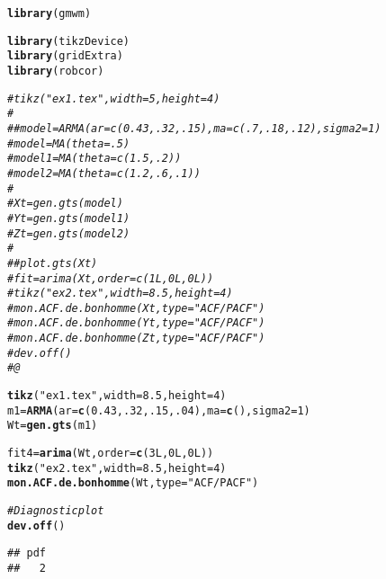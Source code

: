 \documentclass{article}\usepackage[]{graphicx}\usepackage[]{color}
\makeatletter
\newcommand{\hlnum}[1]{\textcolor[rgb]{0.686,0.059,0.569}{#1}}%
\newcommand{\hlstr}[1]{\textcolor[rgb]{0.192,0.494,0.8}{#1}}%
\newcommand{\hlcom}[1]{\textcolor[rgb]{0.678,0.584,0.686}{\textit{#1}}}%
\newcommand{\hlstd}[1]{\textcolor[rgb]{0.345,0.345,0.345}{#1}}%
\newcommand{\hlkwb}[1]{\textcolor[rgb]{0.69,0.353,0.396}{#1}}%
\newcommand{\hlkwc}[1]{\textcolor[rgb]{0.333,0.667,0.333}{#1}}%
\newcommand{\hlkwd}[1]{\textcolor[rgb]{0.737,0.353,0.396}{\textbf{#1}}}%
\newenvironment{kframe}{%
 \def\at@end@of@kframe{}%
 \ifinner\ifhmode%
  \def\at@end@of@kframe{\end{minipage}}%
  \begin{minipage}{\columnwidth}%
 \fi\fi%
 \def\FrameCommand##1{\hskip\@totalleftmargin \hskip-\fboxsep
 \colorbox{shadecolor}{##1}\hskip-\fboxsep
     \hskip-\linewidth \hskip-\@totalleftmargin \hskip\columnwidth}%
 \MakeFramed {\advance\hsize-\width
   \@totalleftmargin\z@ \linewidth\hsize
   \@setminipage}}%
 {\par\unskip\endMakeFramed%
 \at@end@of@kframe}
\newenvironment{knitrout}{}{} %
\makeatother
\begin{document}
\begin{knitrout}
\color{fgcolor}\begin{kframe}
\begin{alltt}
\hlkwd{library}\hlstd{(gmwm)}
\end{alltt}


{\ttfamily\noindent\itshape\color{messagecolor}{\#\# Loading required package: ggplot2}}\begin{alltt}
\hlkwd{library}\hlstd{(tikzDevice)}
\hlkwd{library}\hlstd{(gridExtra)}
\hlkwd{library}\hlstd{(robcor)}

\hlcom{# tikz("ex1.tex", width = 5, height = 4)}
\hlcom{# }
\hlcom{# #model = ARMA(ar = c(0.43,.32, .15), ma = c(.7, .18, .12),sigma2 = 1)}
\hlcom{# model = MA(theta = .5)}
\hlcom{# model1 = MA(theta = c(1.5,.2))}
\hlcom{# model2 = MA(theta = c(1.2,.6,.1))}
\hlcom{# }
\hlcom{# Xt = gen.gts(model)}
\hlcom{# Yt = gen.gts(model1)}
\hlcom{# Zt = gen.gts(model2)}
\hlcom{# }
\hlcom{# #plot.gts(Xt)}
\hlcom{# fit = arima(Xt,order = c(1L,0L,0L))}
\hlcom{# tikz("ex2.tex", width = 8.5, height = 4)}
\hlcom{# mon.ACF.de.bonhomme(Xt, type = "ACF/PACF")}
\hlcom{# mon.ACF.de.bonhomme(Yt, type = "ACF/PACF")}
\hlcom{# mon.ACF.de.bonhomme(Zt, type = "ACF/PACF")}
\hlcom{# dev.off()}
\hlcom{# @}

\hlkwd{tikz}\hlstd{(}\hlstr{"ex1.tex"}\hlstd{,} \hlkwc{width} \hlstd{=} \hlnum{8.5}\hlstd{,} \hlkwc{height} \hlstd{=} \hlnum{4}\hlstd{)}
\hlstd{m1} \hlkwb{=} \hlkwd{ARMA}\hlstd{(}\hlkwc{ar} \hlstd{=} \hlkwd{c}\hlstd{(}\hlnum{0.43}\hlstd{,}\hlnum{.32}\hlstd{,} \hlnum{.15}\hlstd{,} \hlnum{.04}\hlstd{),} \hlkwc{ma} \hlstd{=} \hlkwd{c}\hlstd{() ,}\hlkwc{sigma2} \hlstd{=} \hlnum{1}\hlstd{)}
\hlstd{Wt} \hlkwb{=} \hlkwd{gen.gts}\hlstd{(m1)}

\hlstd{fit4} \hlkwb{=} \hlkwd{arima}\hlstd{(Wt,}\hlkwc{order} \hlstd{=} \hlkwd{c}\hlstd{(}\hlnum{3L}\hlstd{,}\hlnum{0L}\hlstd{,}\hlnum{0L}\hlstd{))}
\hlkwd{tikz}\hlstd{(}\hlstr{"ex2.tex"}\hlstd{,} \hlkwc{width} \hlstd{=} \hlnum{8.5}\hlstd{,} \hlkwc{height} \hlstd{=} \hlnum{4}\hlstd{)}
\hlkwd{mon.ACF.de.bonhomme} \hlstd{(Wt,} \hlkwc{type} \hlstd{=} \hlstr{"ACF/PACF"}\hlstd{)}
\end{alltt}


{\ttfamily\noindent\color{warningcolor}{\#\# Warning: Removed 1 rows containing missing values (geom\_segment).}}\begin{alltt}
\hlcom{# Diagnostic plot}
\hlkwd{dev.off}\hlstd{()}
\end{alltt}
\begin{verbatim}
## pdf 
##   2
\end{verbatim}
\end{kframe}
\end{knitrout}

\begin{figure}

\end{figure}

\begin{figure}

\end{figure}

% 
\end{document}
